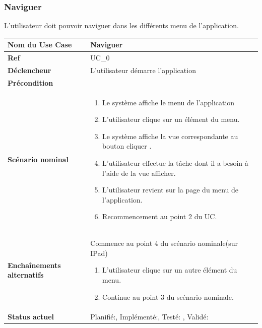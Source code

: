		\subsubsection{Naviguer}
				L'utilisateur doit pouvoir naviguer dans les différents menu de l'application.\\[0.2cm]
				\begin{longtable}{|l|p{10cm}|}
					\hline \textbf{Nom du Use Case} & Naviguer \\ 
					\hline \textbf{Ref} & UC\_0  \\ 
					\hline \textbf{Déclencheur} & L'utilisateur démarre l'application \\
					\hline \textbf{Précondition} &  \\
					\hline \textbf{Scénario nominal} & 
					\begin{enumerate}
						\item Le système affiche le menu de l'application
						\item L'utilisateur clique sur  un élément du menu.
						\item Le système affiche la vue correspondante au bouton cliquer .
						\item L'utilisateur effectue la tâche dont il a besoin à l'aide de la vue afficher.
						\item L'utilisateur revient sur la page du menu de l'application.
						\item Recommencement au point 2 du UC.
					\end{enumerate}
					\\ 
					\hline \textbf{Enchaînements alternatifs} &  
						Commence au point 4 du scénario  nominale(sur IPad)
						\begin{enumerate}
							\item L'utilisateur  clique sur un autre élément du menu.
							\item Continue au point 3 du scénario nominale.
						\end{enumerate}
						
					\\
					\hline \textbf{Status actuel} & Planifié:\CheckedBox , Implémenté:\CheckedBox , Testé: \CheckedBox , Validé: \CheckedBox \\
					\hline 
				\end{longtable} 
